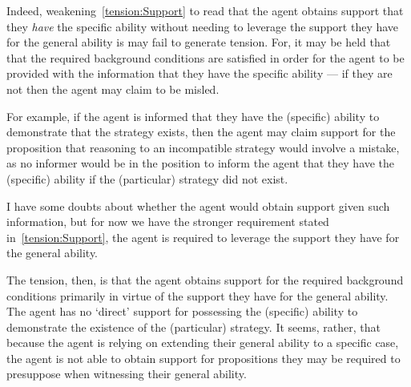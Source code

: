 \documentclass[10pt]{article}
\newcommand{\AR}[0]{\textsf{Attribution}}
\begin{document}
\begin{note}[Tension]
  Indeed, weakening~\ref{tension:Support} to read that the agent obtains support that they \emph{have} the specific ability without needing to leverage the support they have for the general ability is may fail to generate tension.
  For, it may be held that that the required background conditions are satisfied in order for the agent to be provided with the information that they have the specific ability --- if they are not then the agent may claim to be misled.

  For example, if the agent is informed that they have the (specific) ability to demonstrate that the  strategy exists, then the agent may claim support for the proposition that reasoning to an incompatible strategy would involve a mistake, as no informer would be in the position to inform the agent that they have the (specific) ability if the (particular) strategy did not exist.

  I have some doubts about whether the agent would obtain support given such information, but for now we have the stronger requirement stated in~\ref{tension:Support}, the agent is required to leverage the support they have for the general ability.

  The tension, then, is that the agent obtains support for the required background conditions primarily in virtue of the support they have for the general ability.
  The agent has no `direct' support for possessing the (specific) ability to demonstrate the existence of the (particular) strategy.
  It seems, rather, that because the agent is relying on extending their general ability to a specific case, the agent is not able to obtain support for propositions they may be required to presuppose when witnessing their general ability.



\end{note}
\end{document}
